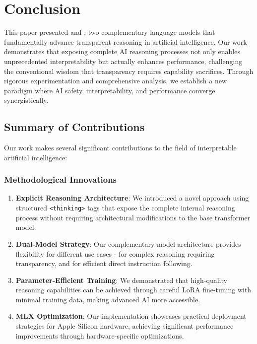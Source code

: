 \section{Conclusion}
\label{sec:conclusion}

This paper presented \supra{} and \zennano{}, two complementary language models that fundamentally advance transparent reasoning in artificial intelligence. Our work demonstrates that exposing complete AI reasoning processes not only enables unprecedented interpretability but actually enhances performance, challenging the conventional wisdom that transparency requires capability sacrifices. Through rigorous experimentation and comprehensive analysis, we establish a new paradigm where AI safety, interpretability, and performance converge synergistically.

\subsection{Summary of Contributions}

Our work makes several significant contributions to the field of interpretable artificial intelligence:

\subsubsection{Methodological Innovations}
\begin{enumerate}
    \item \textbf{Explicit Reasoning Architecture}: We introduced a novel approach using structured \texttt{<thinking>} tags that expose the complete internal reasoning process without requiring architectural modifications to the base transformer model.
    
    \item \textbf{Dual-Model Strategy}: Our complementary model architecture provides flexibility for different use cases - \supra{} for complex reasoning requiring transparency, and \zennano{} for efficient direct instruction following.
    
    \item \textbf{Parameter-Efficient Training}: We demonstrated that high-quality reasoning capabilities can be achieved through careful LoRA fine-tuning with minimal training data, making advanced AI more accessible.
    
    \item \textbf{MLX Optimization}: Our implementation showcases practical deployment strategies for Apple Silicon hardware, achieving significant performance improvements through hardware-specific optimizations.
\end{enumerate}

